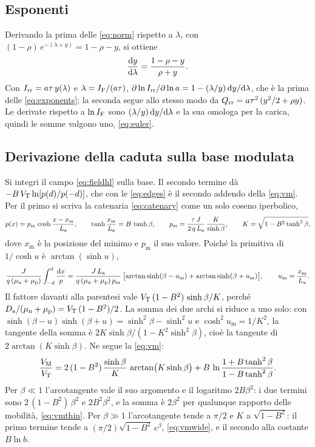 \documentclass[10pt,a4paper]{scrartcl}
\let\newcommand\pdvaluedefine
\newcommand{\IF}{I_\mathrm{F}}
\newcommand{\Irr}{I_\mathrm{rr}}
\newcommand{\Qrr}{Q_\mathrm{rr}}
\newcommand{\VT}{V_\mathrm{T}}
\newcommand{\diff}{\mathrm{d}}
\newcommand{\Da}{D_\mathrm{a}}
\newcommand{\La}{L_\mathrm{a}}
\newcommand{\mun}{\mu_\mathrm{n}}
\newcommand{\mup}{\mu_\mathrm{p}}
\newcommand{\VM}{V_\mathrm{M}}
\begin{document}
\subsection{Esponenti}
\label{app:exponents}
Derivando la prima delle \eqref{eq:norm} rispetto a $\lambda$, con $(1-\rho)\,e^{-(\lambda+y)} = 1-\rho-y$, si ottiene
\begin{equation}
\frac{\diff y}{\diff\lambda} = \frac{1-\rho-y}{\rho+y} .
\end{equation}
Con $\Irr = a\tau\,y(\lambda)$ e $\lambda = \IF/(a\tau)$, $\partial\ln\Irr/\partial\ln a = 1 - (\lambda/y)\,\diff y/\diff\lambda$, che è la prima delle \eqref{eq:exponents}; la seconda segue allo stesso modo da $\Qrr = a\tau^2\,(y^2/2+\rho y)$. Le derivate rispetto a $\ln\IF$ sono $(\lambda/y)\,\diff y/\diff\lambda$ e la sua omologa per la carica, quindi le somme valgono uno, \eqref{eq:euler}.

\subsection{Derivazione della caduta sulla base modulata}
\label{app:vm}
Si integri il campo \eqref{eq:fieldhl} sulla base. Il secondo termine dà $-B\,\VT\ln[p(d)/p(-d)]$, che con le \eqref{eq:edges} è il secondo addendo della \eqref{eq:vm}. Per il primo si scriva la catenaria \eqref{eq:catenary} come un solo coseno iperbolico,
\begin{equation}
p(x) = p_\mathrm{m}\,\cosh\frac{x - x_\mathrm{m}}{\La} , \qquad \tanh\frac{x_\mathrm{m}}{\La} = B\,\tanh\beta , \qquad
p_\mathrm{m} = \frac{\tau\,J}{2\,q\,\La}\,\frac{K}{\sinh\beta} , \qquad K = \sqrt{1 - B^2\tanh^2\beta} ,
\end{equation}
dove $x_\mathrm{m}$ è la posizione del minimo e $p_\mathrm{m}$ il suo valore. Poiché la primitiva di $1/\cosh u$ è $\arctan(\sinh u)$,
\begin{equation}
\frac{J}{q\,(\mun+\mup)}\int_{-d}^{d}\frac{\diff x}{p}
= \frac{J\,\La}{q\,(\mun+\mup)\,p_\mathrm{m}}\,\bigl[\arctan\sinh(\beta - u_\mathrm{m}) + \arctan\sinh(\beta + u_\mathrm{m})\bigr] , \qquad u_\mathrm{m} = \frac{x_\mathrm{m}}{\La} .
\end{equation}
Il fattore davanti alla parentesi vale $\VT\,(1-B^2)\,\sinh\beta/K$, perché $\Da/(\mun+\mup) = \VT\,(1-B^2)/2$. La somma dei due archi si riduce a uno solo: con $\sinh(\beta-u)\sinh(\beta+u) = \sinh^2\beta - \sinh^2 u$ e $\cosh^2 u_\mathrm{m} = 1/K^2$, la tangente della somma è $2K\sinh\beta/(1 - K^2\sinh^2\beta)$, cioè la tangente di $2\arctan(K\sinh\beta)$. Ne segue la \eqref{eq:vm}:
\begin{equation}
\frac{\VM}{\VT} = 2\,(1-B^2)\,\frac{\sinh\beta}{K}\,\arctan\bigl(K\sinh\beta\bigr) + B\,\ln\frac{1 + B\tanh^2\beta}{1 - B\tanh^2\beta} .
\end{equation}
Per $\beta \ll 1$ l'arcotangente vale il suo argomento e il logaritmo $2B\beta^2$: i due termini sono $2\,(1-B^2)\,\beta^2$ e $2B^2\beta^2$, e la somma è $2\beta^2$ per qualunque rapporto delle mobilità, \eqref{eq:vmthin}. Per $\beta \gg 1$ l'arcotangente tende a $\pi/2$ e $K$ a $\sqrt{1-B^2}$: il primo termine tende a $(\pi/2)\sqrt{1-B^2}\,e^{\beta}$, \eqref{eq:vmwide}, e il secondo alla costante $B\ln b$.
\end{document}
